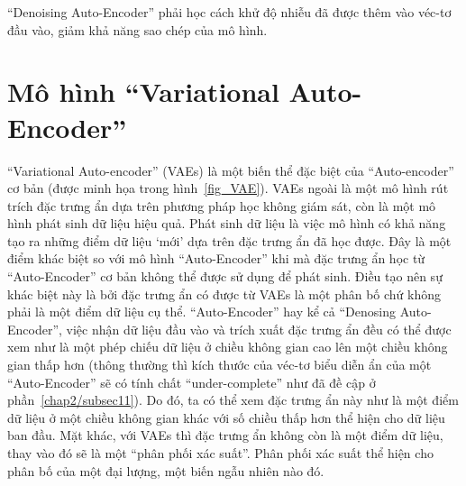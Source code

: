     ``Denoising Auto-Encoder'' phải học cách khử độ nhiễu đã được thêm vào véc-tơ đầu vào,
    giảm khả năng sao chép của mô hình.






\section{Mô hình ``Variational Auto-Encoder''} \label{chap2/sec2}
        ``Variational Auto-encoder'' (VAEs) là một biến thể đặc biệt của ``Auto-encoder'' cơ bản (được minh họa trong hình~\ref{fig_VAE}). 
        VAEs ngoài là một mô hình rút trích đặc trưng ẩn dựa trên phương pháp học không giám sát, còn là một mô hình phát sinh dữ liệu hiệu quả. 
        Phát sinh dữ liệu là việc mô hình có khả năng tạo ra những điểm dữ liệu `mới' dựa trên đặc trưng ẩn đã học được.
        Đây là một điểm khác biệt so với mô hình ``Auto-Encoder'' khi mà đặc trưng ẩn học từ ``Auto-Encoder'' cơ bản không thể được sử dụng để phát sinh. 
        Điều tạo nên sự khác biệt này là bởi đặc trưng ẩn có được từ VAEs là một phân bố chứ không phải là một điểm dữ liệu cụ thể. 
        ``Auto-Encoder'' hay kể cả ``Denosing Auto-Encoder'', việc nhận dữ liệu đầu vào và trích xuất đặc trưng ẩn đều có thể được xem như là một phép chiếu dữ liệu ở chiều không gian cao lên một chiều không gian thấp hơn (thông thường thì kích thước của véc-tơ biểu diễn ẩn của một ``Auto-Encoder'' sẽ có tính chất ``under-complete'' như đã đề cập ở phần~\ref{chap2/subsec11}). 
        Do đó, ta có thể xem đặc trưng ẩn này như là một điểm dữ liệu ở một chiều không gian khác với số chiều thấp hơn thể hiện cho dữ liệu ban đầu. 
        Mặt khác, với VAEs thì đặc trưng ẩn không còn là một điểm dữ liệu, thay vào đó sẽ là một ``phân phối xác suất''. 
        Phân phối xác suất thể hiện cho phân bố của một đại lượng, một biến ngẫu nhiên nào đó.
    
